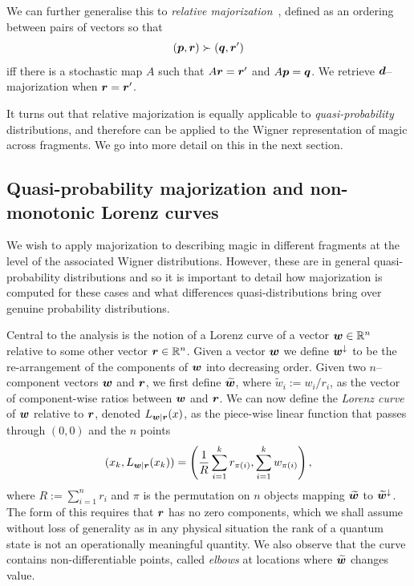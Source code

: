 \documentclass[pra,
aps,
twocolumn,
superscriptaddress,
groupedaddress,
nofootinbib,
reprint
]{revtex4-1}
\begin{document}
We can further generalise this to \emph{relative majorization}~\cite{Ruch_1976, ruch_mixing_1978, Renes_2016, Buscemi_2017}, defined as an ordering between pairs of vectors so that 
\begin{equation}
	(\boldsymbol{p},\boldsymbol{r}) \succ (\boldsymbol{q}, \boldsymbol{r}')
\end{equation}
iff there is a stochastic map $A$ such that $A\boldsymbol{r} = \boldsymbol{r}'$ and $A\boldsymbol{p} = \boldsymbol{q}$. We retrieve $\bm{d}$--majorization when $\boldsymbol{r} = \boldsymbol{r}'$.

It turns out that relative majorization is equally applicable to \emph{quasi-probability} distributions, and therefore can be applied to the Wigner representation of magic across fragments. We go into more detail on this in the next section.

\subsection{Quasi-probability majorization and non-monotonic Lorenz curves}
\label{sec:lc}

We wish to apply majorization to describing magic in different fragments at the level of the associated Wigner distributions. However, these are in general quasi-probability distributions and so it is important to detail how majorization is computed for these cases and what differences quasi-distributions bring over genuine probability distributions.

Central to the analysis is the notion of a Lorenz curve of a vector $\boldsymbol{w} \in \mathbb{R}^n$ relative to some other vector $\boldsymbol{r} \in \mathbb{R}^n$. Given a vector $\boldsymbol{w}$ we define $\boldsymbol{w}^\downarrow$ to be the re-arrangement of the components of $\boldsymbol{w}$ into decreasing order. Given two $n$--component vectors $\boldsymbol{w}$ and $\boldsymbol{r}$, we first define $\widetilde{\boldsymbol{w}}$, where $\widetilde{w}_i := w_i/r_i$, as the vector of component-wise ratios between $\boldsymbol{w}$ and $\boldsymbol{r}$.
We can now define the \emph{Lorenz curve} of $\boldsymbol{w}$ relative to $\boldsymbol{r}$, denoted $L_{\boldsymbol{w}|\boldsymbol{r}}(x)$, as the piece-wise linear function that passes through $(0,0)$ and the $n$ points
\begin{equation}
\label{eq:lc}
        (x_k,L_{\boldsymbol{w}|\boldsymbol{r}}(x_k)) =\left( \frac{1}{R}\sum_{i=1}^k r_{\pi(i)}, \sum_{i=1}^k w_{\pi(i)} \right),
\end{equation}
where $R:= \sum_{i=1}^n r_i$ and $\pi$ is the permutation on $n$ objects mapping $\widetilde{\boldsymbol{w}}$ to $\widetilde{\boldsymbol{w}}^{\downarrow}$. The form of this requires that $\boldsymbol{r}$ has no zero components, which we shall assume without loss of generality as in any physical situation the rank of a quantum state is not an operationally meaningful quantity.
We also observe that the curve contains non-differentiable points, called \emph{elbows} at locations where $\widetilde{\bm{w}}$ changes value.
\end{document}
